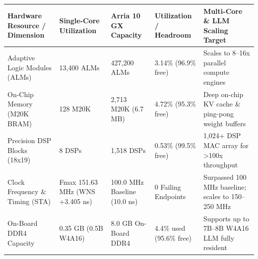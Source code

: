 \documentclass[11pt,a4paper]{article}
\begin{document}
{\footnotesize\renewcommand{\arraystretch}{1.14}\begin{longtable}{@{}L{0.21\textwidth}L{0.16\textwidth}L{0.16\textwidth}L{0.15\textwidth}L{0.22\textwidth}@{}}\toprule

\textbf{Hardware Resource /\allowbreak{} Dimension} & \textbf{Single-Core Utilization} & \textbf{Arria 10 GX Capacity} & \textbf{Utilization /\allowbreak{} Headroom} & \textbf{Multi-Core \& LLM Scaling Target}\\\midrule\endhead

Adaptive Logic Modules (\allowbreak{}ALMs)\allowbreak{} & 13,\allowbreak{}400 ALMs & 427,\allowbreak{}200 ALMs & 3.14\% (\allowbreak{}96.9\% free)\allowbreak{} & Scales to 8--16x parallel compute engines\\[2pt]

On-Chip Memory (\allowbreak{}M20K BRAM)\allowbreak{} & 128 M20K & 2,\allowbreak{}713 M20K (\allowbreak{}6.7 MB)\allowbreak{} & 4.72\% (\allowbreak{}95.3\% free)\allowbreak{} & Deep on-chip KV cache \& ping-pong weight buffers\\[2pt]

Precision DSP Blocks (\allowbreak{}18x19)\allowbreak{} & 8 DSPs & 1,\allowbreak{}518 DSPs & 0.53\% (\allowbreak{}99.5\% free)\allowbreak{} & 1,\allowbreak{}024+\allowbreak{} DSP MAC array for >100x throughput\\[2pt]

Clock Frequency \& Timing (\allowbreak{}STA)\allowbreak{} & Fmax 151.63 MHz (\allowbreak{}WNS +\allowbreak{}3.405 ns)\allowbreak{} & 100.0 MHz Baseline (\allowbreak{}10.0 ns)\allowbreak{} & 0 Failing Endpoints & Surpassed 100 MHz baseline; scales to 150--250 MHz\\[2pt]

On-Board DDR4 Capacity & 0.35 GB (\allowbreak{}0.5B W4A16)\allowbreak{} & 8.0 GB On-Board DDR4 & 4.4\% used (\allowbreak{}95.6\% free)\allowbreak{} & Supports up to 7B--8B W4A16 LLM fully resident\\[2pt]

\bottomrule\end{longtable}}
\end{document}
